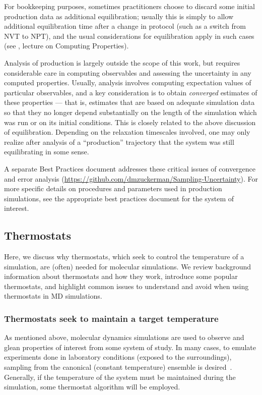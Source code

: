 \documentclass[9pt,bestpractices]{livecoms}
\begin{document}
For bookkeeping purposes, sometimes practitioners choose to discard some initial production data as additional equilibration; usually this is simply to allow additional equilibration time after a change in protocol (such as a switch from NVT to NPT), and the usual considerations for equilibration apply in such cases (see \citet{ShellNotes}, lecture on Computing Properties). 

Analysis of production is largely outside the scope of this work, but requires considerable care in computing observables and assessing the uncertainty in any computed properties.
Usually, analysis involves computing expectation values of particular observables, and a key consideration is to obtain \emph{converged} estimates of these properties --- that is, estimates that are based on adequate simulation data so that they no longer depend substantially on the length of the simulation which was run or on its initial conditions.
This is closely related to the above discussion of equilibration.
Depending on the relaxation timescales involved, one may only realize after analysis of a ``production'' trajectory that the system was still equilibrating in some sense.

A separate Best Practices document addresses these critical issues of convergence and error analysis (\url{https://github.com/dmzuckerman/Sampling-Uncertainty}). 
For more specific details on procedures and parameters used in production simulations, see the appropriate best practices document for the system of interest.


\subsection{Thermostats}
\label{sec:thermostats}

Here, we discuss why thermostats, which seek to control the temperature of a simulation, are (often) needed for molecular simulations. 
We review background information about thermostats and how they work, introduce some popular thermostats, and highlight common issues to understand and avoid when using thermostats in MD simulations.

\subsubsection{Thermostats seek to maintain a target temperature}
As mentioned above, molecular dynamics simulations are used to observe and glean properties of interest from some system of study.
In many cases, to emulate experiments done in laboratory conditions (exposed to the surroundings), sampling from the canonical (constant temperature) ensemble is desired~\cite{thermostatAlgorithms2005}.
Generally, if the temperature of the system must be maintained during the simulation, some thermostat algorithm will be employed. 
\end{document}

